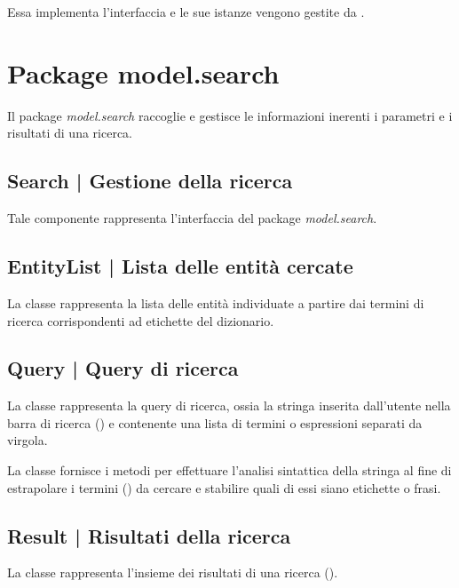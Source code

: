 \documentclass[10pt,a4paper,headinclude,footinclude,hidelinks]{scrreprt} %
\begin{document}
	Essa implementa l'interfaccia \textit{} e le sue istanze vengono gestite da \textit{}.

	\section{Package model.search}
	\label{sec:stage:design:model.search}
	Il package \textit{model.search} raccoglie e gestisce le informazioni inerenti i parametri e i risultati di una ricerca. 

	\subsection[Search]{Search | Gestione della ricerca}
	\label{sec:stage:design:model.search:search}
	Tale componente rappresenta l'interfaccia del package \textit{model.search}.

	\subsection[EntityList]{EntityList | Lista delle entità cercate}
	\label{sec:stage:design:model.search:search-entity-list}
	La classe \textit{} rappresenta la lista delle entità individuate a partire dai termini di ricerca corrispondenti ad etichette del dizionario.

	\subsection[Query]{Query | Query di ricerca}
	\label{sec:stage:design:model.search:search-query}
	La classe \textit{} rappresenta la query di ricerca, ossia la stringa inserita dall'utente nella barra di ricerca (\textit{}) e contenente una lista di termini o espressioni separati da virgola.

	La classe fornisce i metodi per effettuare l'analisi sintattica della stringa al fine di estrapolare i termini (\textit{}) da cercare e stabilire quali di essi siano etichette o frasi.

	\subsection[Result]{Result | Risultati della ricerca}
	\label{sec:stage:design:model.search:search-result}
	La classe \textit{} rappresenta l'insieme dei risultati di una ricerca (\textit{}).
\end{document}
